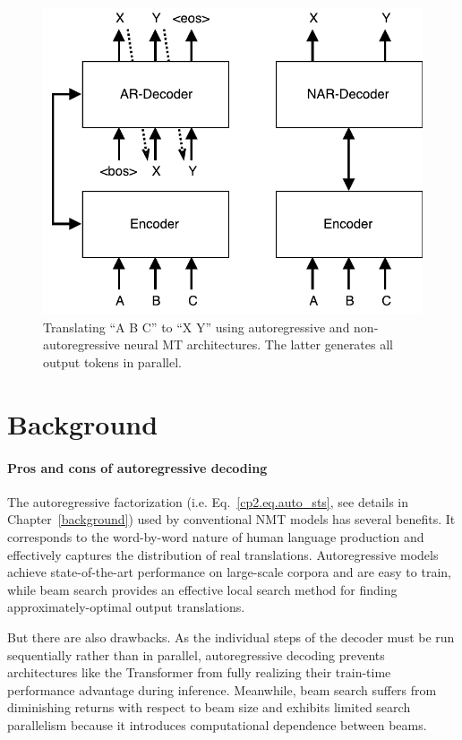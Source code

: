 \begin{figure}[t]
\centering
\includegraphics[width=0.6\linewidth]{figs/nat/ar_nmt}
\caption{\label{cp8.fig.ar_vs_nar} Translating ``A B C'' to ``X Y'' using autoregressive and non-autoregressive neural MT architectures. The latter generates all output tokens in parallel.}
\end{figure}


\section{Background}
\paragraph{Pros and cons of autoregressive decoding}
The autoregressive factorization (i.e. Eq.~\eqref{cp2.eq.auto_sts}, see details in Chapter~\ref{background}) used by conventional NMT models has several benefits. It corresponds to the word-by-word nature of human language production and effectively captures the distribution of real translations. Autoregressive models achieve state-of-the-art performance on large-scale corpora and are easy to train, while beam search provides an effective local search method for finding approximately-optimal output translations.

But there are also drawbacks. As the individual steps of the decoder must be run sequentially rather than in parallel, autoregressive decoding prevents architectures like the Transformer from fully realizing their train-time performance advantage during inference. Meanwhile, beam search suffers from diminishing returns with respect to beam size \citep{koehn2017six} and exhibits limited search parallelism because it introduces computational dependence between beams.


